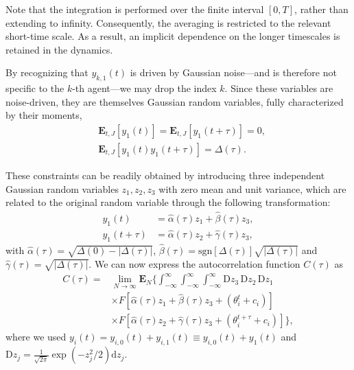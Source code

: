 \documentclass[reprint,amsmath,amssymb,aps]{revtex4-2}
\begin{document}
Note that the integration is performed over the finite interval \( [0, T] \), rather than extending to infinity. Consequently, the averaging is restricted to the relevant short-time scale. As a result, an implicit dependence on the longer timescales is retained in the dynamics.

By recognizing that \( y_{k,1}(t) \) is driven by Gaussian noise---and is therefore not specific to the \( k \)-th agent---we may drop the index \( k \). Since these variables are noise-driven, they are themselves Gaussian random variables, fully characterized by their moments,
\begin{align*}
    & \mathbf{E}_{t,J} \left[ y_1(t) \right] = \mathbf{E}_{t,J} \left[ y_1(t+\tau) \right] = 0,    \\
    & \mathbf{E}_{t,J} \left[ y_1(t)  y_1(t+\tau) \right] = \Delta(\tau).
\end{align*}

These constraints can be readily obtained by introducing three independent Gaussian random variables \( z_1, z_2, z_3 \) with zero mean and unit variance, which are related to the original random variable through the following transformation:
\begin{align*}
    y_1(t) &= \hat{\alpha}(\tau) z_1 + \hat{\beta}(\tau) z_3, \\
    y_1(t+\tau) &= \hat{\alpha}(\tau) z_2 + \hat{\gamma}(\tau) z_3,
\end{align*}
with $\hat{\alpha}(\tau) = \sqrt{\Delta(0) - |\Delta(\tau)|}$, $\hat{\beta}(\tau)= \mathrm{sgn}\left[\Delta(\tau)\right] \sqrt{|\Delta(\tau)|}$ and $\hat{\gamma}(\tau)=\sqrt{|\Delta(\tau)|}$. We can now express the autocorrelation function \( C(\tau) \) as
\begin{align}
\label{eq:autocorrelation}
  C(\tau) =&\lim_{N\to\infty} \mathbf{E}_{N} \Bigg\{\int_{-\infty}^\infty \int_{-\infty}^\infty \int_{-\infty}^\infty \mathrm{D}z_3 \, \mathrm{D}z_2 \, \mathrm{D}z_1 \, 
  \nonumber \\
  &\times 
  F\left[\hat{\alpha}(\tau) z_1 + \hat{\beta}(\tau) z_3 + (\theta_i^t + c_i)\right] \nonumber \\
  &\times 
  F\left[\hat{\alpha}(\tau) z_2 + \hat{\gamma}(\tau) z_3 + (\theta_i^{t+\tau} + c_i)\right]\Bigg\},
\end{align}
where we used $y_i(t) = y_{i,0}(t)+y_{i,1}(t)\equiv y_{i,0}(t)+y_{1}(t)$ and $\mathrm{D}z_j = \frac{1}{\sqrt{2\pi}} \exp(-z_j^2/2) \mathrm{d} z_j$. 
\end{document}
